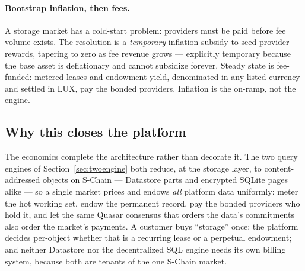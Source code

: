 \paragraph{Bootstrap inflation, then fees.} A storage market has a cold-start
problem: providers must be paid before fee volume exists. The resolution is a
\emph{temporary} inflation subsidy to seed provider rewards, tapering to zero as
fee revenue grows --- explicitly temporary because the base asset is
deflationary and cannot subsidize forever. Steady state is fee-funded: metered
leases and endowment yield, denominated in any listed currency and settled in
LUX, pay the bonded providers. Inflation is the on-ramp, not the engine.

\subsection{Why this closes the platform}

The economics complete the architecture rather than decorate it. The two query
engines of Section~\ref{sec:twoengine} both reduce, at the storage layer, to
content-addressed objects on S-Chain --- Datastore parts and encrypted SQLite
pages alike --- so a single market prices and endows \emph{all} platform data
uniformly: meter the hot working set, endow the permanent record, pay the
bonded providers who hold it, and let the same Quasar consensus that orders the
data's commitments also order the market's payments. A customer buys ``storage''
once; the platform decides per-object whether that is a recurring lease or a
perpetual endowment; and neither Datastore nor the decentralized SQL engine
needs its own billing system, because both are tenants of the one S-Chain
market.
